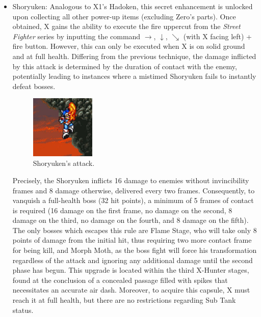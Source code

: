 \begin{itemize}
\item Shoryuken: Analogous to X1's Hadoken, this secret enhancement is unlocked upon collecting all other power-up items (excluding Zero's parts). Once obtained, X gains the ability to execute the fire uppercut from the \textit{Street Fighter} series by inputting the command $\rightarrow$, $ \downarrow$, $\searrow$ (with X facing left) + fire button. However, this can only be executed when X is on solid ground and at full health. Differing from the previous technique, the damage inflicted by this attack is determined by the duration of contact with the enemy, potentially leading to instances where a mistimed Shoryuken fails to instantly defeat bosses.
	\begin{figure}[htp]
	\centering
	\includegraphics[height=3cm]{figures/X2/weapons/Shoryuken.png}
	\caption{Shoryuken's  attack.}
\end{figure} Precisely, the Shoryuken inflicts 16 damage to enemies without invincibility frames and 8 damage otherwise, delivered every two frames. Consequently, to vanquish a full-health boss (32 hit points), a minimum of 5 frames of contact is required (16 damage on the first frame, no damage on the second, 8 damage on the third, no damage on the fourth, and 8 damage on the fifth). The only bosses which escapes this rule are Flame Stage, who will take only 8 points of damage from the initial hit, thus requiring two more contact frame for being kill, and Morph Moth, as the boss fight will force his transformation regardless of the attack and ignoring any additional damage until the second phase has begun. This upgrade is located within the third X-Hunter stages, found at the conclusion of a concealed passage filled with spikes that necessitates an accurate air dash. Moreover, to acquire this capsule, X must reach it at full health, but there are no restrictions regarding Sub Tank status.
\end{itemize}

	

